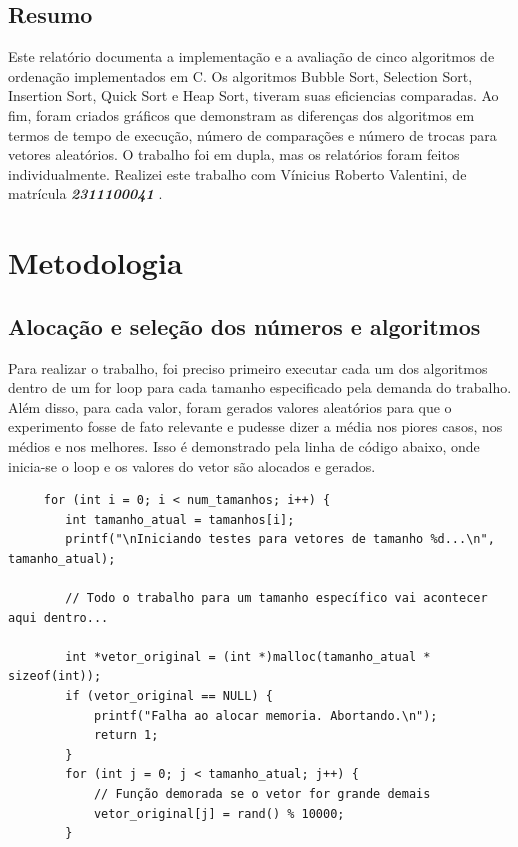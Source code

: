 \documentclass[a4paper]{article}
\begin{document}
    \renewcommand{\contentsname}{SUMÁRIO}
    \tableofcontents
    \newpage

    \subsection{Resumo}\label{subsec:resumo}
    Este relatório documenta a implementação e a avaliação de cinco algoritmos de ordenação implementados em C. Os algoritmos Bubble Sort, Selection Sort, Insertion Sort, Quick Sort e Heap Sort, tiveram suas eficiencias comparadas. Ao fim, foram criados gráficos que
    demonstram as diferenças dos algoritmos em termos de tempo de execução, número de comparações e número de trocas para vetores aleatórios.
    O trabalho foi em dupla, mas os relatórios foram feitos individualmente.
    Realizei este trabalho com Vínicius Roberto Valentini, de matrícula \textbf{\textit{2311100041} }.


    \section{Metodologia}\label{sec:metodologia}
    \subsection{Alocação e seleção dos números e algoritmos}\label{subsec:alocacao-e-selecao-dos-numeros}
    Para realizar o trabalho, foi preciso primeiro executar cada um dos algoritmos dentro de um for loop para cada tamanho especificado pela demanda do trabalho.
    Além disso, para cada valor, foram gerados valores aleatórios para que o experimento fosse de fato relevante e pudesse dizer a média nos piores casos, nos médios e nos melhores.
    Isso é demonstrado pela linha de código abaixo, onde inicia-se o loop e os valores do vetor são alocados e gerados.
    \begin{verbatim}
     for (int i = 0; i < num_tamanhos; i++) {
        int tamanho_atual = tamanhos[i];
        printf("\nIniciando testes para vetores de tamanho %d...\n", tamanho_atual);

        // Todo o trabalho para um tamanho específico vai acontecer aqui dentro...

        int *vetor_original = (int *)malloc(tamanho_atual * sizeof(int));
        if (vetor_original == NULL) {
            printf("Falha ao alocar memoria. Abortando.\n");
            return 1;
        }
        for (int j = 0; j < tamanho_atual; j++) {
            // Função demorada se o vetor for grande demais
            vetor_original[j] = rand() % 10000;
        }
    \end{verbatim}
\end{document}
